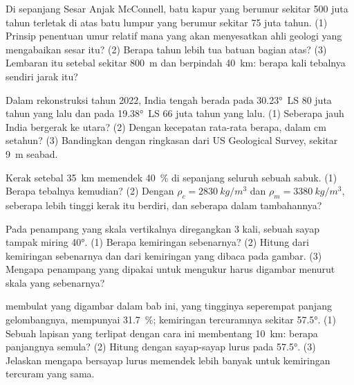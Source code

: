 \begin{exercise}[$\star\star$]\label{exo:g12:mountain-building:8}
Di sepanjang Sesar Anjak McConnell, batu kapur yang berumur sekitar 500 juta
tahun terletak di atas batu lumpur yang berumur sekitar 75 juta tahun.
(1) Prinsip penentuan umur relatif mana yang akan menyesatkan ahli geologi
yang mengabaikan sesar itu? (2) Berapa tahun lebih tua batuan bagian atas?
(3) Lembaran  itu setebal sekitar \qty{800}{m} dan berpindah
\qty{40}{km}: berapa kali tebalnya sendiri jarak itu?
\end{exercise}

\begin{exercise}[$\star\star$]\label{exo:g12:mountain-building:9}
Dalam rekonstruksi tahun 2022, India tengah berada pada \ang{30.23}~LS 80 juta
tahun yang lalu dan pada \ang{19.38}~LS 66 juta tahun yang lalu. (1) Seberapa
jauh India bergerak ke utara? (2) Dengan kecepatan rata-rata berapa, dalam
\unit{cm} setahun? (3) Bandingkan dengan ringkasan dari US Geological Survey,
sekitar \qty{9}{m} seabad.
\end{exercise}

\begin{exercise}[$\star\star$]\label{exo:g12:mountain-building:10}
Kerak setebal \qty{35}{km} memendek \qty{40}{\percent} di sepanjang seluruh
sebuah sabuk. (1) Berapa tebalnya kemudian? (2) Dengan $\rho_c =
\qty{2830}{kg/m^3}$ dan $\rho_m = \qty{3380}{kg/m^3}$, seberapa lebih tinggi
kerak itu berdiri, dan seberapa dalam  tambahannya?
\end{exercise}

\begin{exercise}[$\star\star$]\label{exo:g12:mountain-building:11}
Pada penampang yang skala vertikalnya diregangkan 3 kali, sebuah sayap tampak
miring \ang{40}. (1) Berapa kemiringan sebenarnya? (2) Hitung  dari
kemiringan sebenarnya dan dari kemiringan yang dibaca pada gambar. (3) Mengapa
penampang yang dipakai untuk mengukur  harus digambar menurut skala
yang sebenarnya?
\end{exercise}

\begin{exercise}[$\star\star\star$]\label{exo:g12:mountain-building:12}
 membulat yang digambar dalam bab ini, yang tingginya seperempat
panjang gelombangnya, mempunyai  \qty{31.7}{\percent}; kemiringan
tercuramnya sekitar \ang{57.5}. (1) Sebuah lapisan yang terlipat dengan cara ini
membentang \qty{10}{km}: berapa panjangnya semula? (2) Hitung 
 dengan sayap-sayap lurus pada \ang{57.5}. (3) Jelaskan mengapa 
bersayap lurus memendek lebih banyak untuk kemiringan tercuram yang sama.
\end{exercise}

